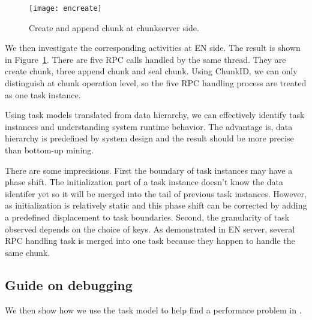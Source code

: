\begin{figure}
\centering
\texttt{[image: encreate]}
\caption{Create and append chunk at chunkserver side.}
\label{fig:encreate}
\end{figure}

We then investigate the corresponding activities at EN side.
The result is shown in Figure~\ref{fig:encreate}. There
are five RPC calls handled by the same thread. They are
create chunk, three append chunk and seal chunk. Using
ChunkID, we can only distinguish at chunk operation level,
so the five RPC handling process are treated as one task
instance.

\lesson Using task models translated from data hierarchy, we
can effectively identify task instances and understanding
system runtime behavior. The advantage is, data
hierarchy is predefined by system design and the result
should be more precise than bottom-up mining.



There are some imprecisions. First the boundary of task
instances may have a phase shift. The initialization part of
a task instance doesn't know the data identifer yet so it
will be merged into the tail of previous task instances.
However, as initialization is relatively static and this
phase shift can be corrected by adding a predefined
displacement to task boundaries. Second, the granularity of
task observed depends on the choice of keys.  As
demonstrated in EN server, several RPC handling task is
merged into one task because they happen to handle the
same chunk.

\subsection{Guide on debugging}

We then show how we use the task model to help find a
performace problem in \cosmos.


